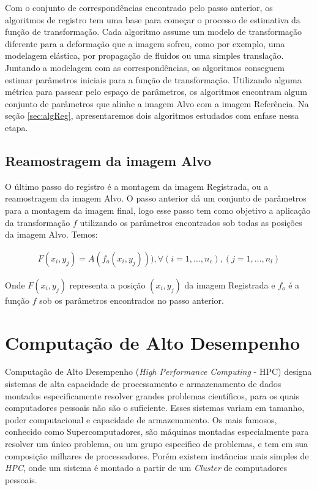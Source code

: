 Com o conjunto de correspondências encontrado pelo passo anterior, os algoritmos de registro tem uma base para 
começar o processo de estimativa da função de transformação. Cada algoritmo assume um modelo de transformação diferente
para a deformação que a imagem sofreu, como por exemplo, uma modelagem elástica, por propagação de fluidos ou uma
simples translação. Juntando a modelagem com as correspondências, os algoritmos conseguem estimar parâmetros iniciais
para a função de transformação. Utilizando alguma métrica para passear pelo espaço de parâmetros, os algoritmos encontram
algum conjunto de parâmetros que alinhe a imagem Alvo com a imagem Referência. Na seção \ref{sec:algReg}, apresentaremos
dois algoritmos estudados com enfase nessa etapa.

\subsection{Reamostragem da imagem Alvo}

O último passo do registro é a montagem da imagem Registrada, ou a reamostragem da imagem Alvo. O passo anterior
dá um conjunto de parâmetros para a montagem da imagem final, logo esse passo tem como objetivo a aplicação
da transformação $f$ utilizando os parâmetros encontrados sob todas as posições da imagem Alvo. Temos:

\begin{align}\label{eq:reamostragem}
    F(x_i,y_j) = A(f_o(x_i,y_j))), \forall (i = 1, \dots, n_c), (j = 1, \dots, n_l)
\end{align}

    Onde $F(x_i,y_j)$ representa a posição $(x_i,y_j)$ da imagem Registrada e $f_o$ é a função $f$ sob os parâmetros
encontrados no passo anterior.

\section{Computação de Alto Desempenho}\label{GPGPU}
    
    Computação de Alto Desempenho (\textit{High Performance Computing} - HPC) designa sistemas de alta capacidade de processamento
e armazenamento de dados montados especificamente resolver grandes problemas científicos, para os quais computadores pessoais não
são o suficiente. Esses sistemas variam em tamanho, poder computacional e capacidade de armazenamento. Os mais famosos,
conhecido como Supercomputadores, são máquinas montadas especialmente para resolver um único problema, ou um grupo
especifico de problemas, e tem em sua composição milhares de processadores. Porém existem instâncias mais simples de 
\textit{HPC}, onde um sistema é montado a partir de um \textit{Cluster} de computadores pessoais.

